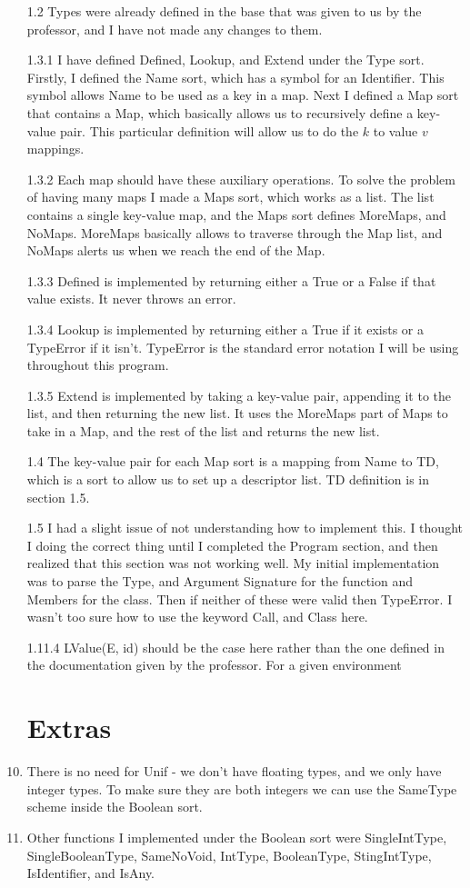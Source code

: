 \documentclass[11pt, oneside]{article}
\begin{document}
\begin{enumerate}
\item[1.2] Types were already defined in the base that was given to us by the professor, and I have not made any changes to them.
\item[1.3.1] I have defined Defined, Lookup, and Extend under the Type sort. Firstly, I defined the Name sort, which has a symbol for an Identifier. This symbol allows Name to be used as a key in a map. Next I defined a Map sort that contains a Map, which basically allows us to recursively define a key-value pair. This particular definition will allow us to do the $k$ to value $v$ mappings.
\item[1.3.2] Each map should have these auxiliary operations. To solve the problem of having many maps I made a Maps sort, which works as a list. The list contains a single key-value map, and the Maps sort defines MoreMaps, and NoMaps. MoreMaps basically allows to traverse through the Map list, and NoMaps alerts us when we reach the end of the Map.
\item[1.3.3] Defined is implemented by returning either a True or a False if that value exists. It never throws an error.
\item[1.3.4] Lookup is implemented by returning either a True if it exists or a TypeError if it isn't. TypeError is the standard error notation I will be using throughout this program.
\item[1.3.5] Extend is implemented by taking a key-value pair, appending it to the list, and then returning the new list. It uses the MoreMaps part of Maps to take in a Map, and the rest of the list and returns the new list.
\item[1.4] The key-value pair for each Map sort is a mapping from Name to TD, which is a sort to allow us to set up a descriptor list. TD definition is in section 1.5.
\item[1.5] I had a slight issue of not understanding how to implement this. I thought I doing the correct thing until I completed the Program section, and then realized that this section was not working well. My initial implementation was to parse the Type, and Argument Signature for the function and Members for the class. Then if neither of these were valid then TypeError. I wasn't too sure how to use the keyword Call, and Class here. 
\item[1.11.4] LValue(E, id) should be the case here rather than the one defined in the documentation given by the professor. For a given environment 

\section{Extras}
\item There is no need for Unif - we don't have floating types, and we only have integer types. To make sure they are both integers we can use the SameType scheme inside the Boolean sort.
\item Other functions I implemented under the Boolean sort were SingleIntType, SingleBooleanType, SameNoVoid, IntType, BooleanType, StingIntType, IsIdentifier, and IsAny.

\end{enumerate}
\end{document}
